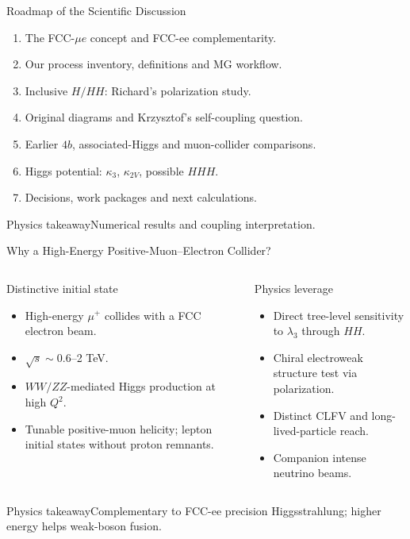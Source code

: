 \documentclass[aspectratio=1610,english]{beamer}
\newcommand{\src}[1]{\vfill{\par\color{black!65}\fontsize{6.4}{7.4}\selectfont\emph{Source:} #1\par}}
\newcommand{\key}[1]{\begin{alertblock}{Physics takeaway}\small  #1\end{alertblock}}
\begin{document}
\begin{frame}[t]{Roadmap of the Scientific Discussion}
\normalsize

\begin{enumerate}
\justifying 
\item The FCC-$\mu e$ concept and FCC-ee complementarity.
\item Our process inventory, definitions and MG workflow.
\item Inclusive $H/HH$: Richard's polarization study.
\item Original diagrams and Krzysztof's self-coupling question.
\item Earlier $4b$, associated-Higgs and muon-collider comparisons.
\item Higgs potential: $\kappa_3$, $\kappa_{2V}$, possible $HHH$.
\item Decisions, work packages and next calculations.
\end{enumerate}

\key{Numerical results and coupling interpretation.}

\end{frame}




\begin{frame}[t]{Why a High-Energy Positive-Muon--Electron Collider?}
\small

\begin{columns}%
\begin{block}{Distinctive initial state}
\begin{itemize}
\justifying
\item High-energy $\mu^+$ collides with a FCC electron beam.
\item $\sqrt{s}\sim0.6$--2 TeV.
\item $WW/ZZ$-mediated Higgs production at high $Q^2$.
\item Tunable positive-muon helicity; lepton initial states without proton remnants.
\end{itemize}\end{block}
\begin{alertblock}{Physics leverage}
\begin{itemize}
\justifying	
\item Direct tree-level sensitivity to $\lambda_3$ through $HH$.
\item Chiral electroweak structure test via polarization.
\item Distinct CLFV and long-lived-particle reach.
\item Companion intense neutrino beams.
\end{itemize}\end{alertblock}
\end{columns}
\key{Complementary to FCC-ee precision Higgsstrahlung; higher energy helps weak-boson fusion.}

\end{frame}
\end{document}
